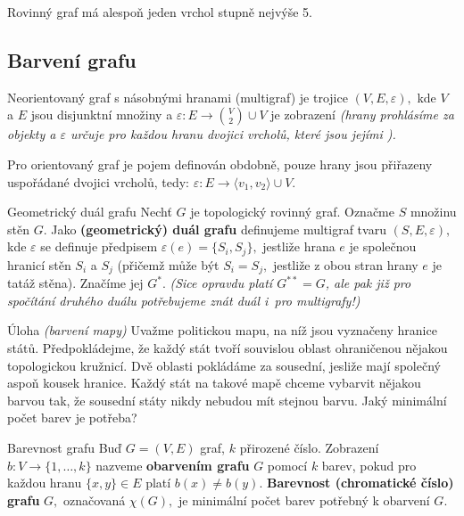 \begin{dusledek}
Rovinný graf má alespoň jeden vrchol stupně nejvýše 5.
\end{dusledek}

\subsection{Barvení grafu}

\begin{definiceN}{Neorientovaný graf s násobnými hranami (multigraf)}
je trojice $(V,E,\varepsilon),$ kde $V$ a $E$ jsou disjunktní množiny a $\varepsilon: E \to \binom{V}{2} \cup V$ je zobrazení \textit{(hrany prohlásíme za  objekty a $\varepsilon$ určuje pro každou hranu dvojici vrcholů, které jsou jejími ).}
\end{definiceN}

\begin{poznamka}
Pro orientovaný graf je pojem definován obdobně, pouze hrany jsou přiřazeny uspořádané dvojici vrcholů, tedy: $\varepsilon: E \to \langle v_1,v_2 \rangle \cup V$.
\end{poznamka}

\begin{definiceN}{Geometrický duál grafu}
Nechť $G$ je topologický rovinný graf. Označme $S$ množinu stěn $G.$ Jako \textbf{(geometrický) duál grafu} definujeme multigraf tvaru $(S,E,\varepsilon),$ kde $\varepsilon$ se definuje předpisem $\varepsilon(e)=\{S_i,S_j\},$ jestliže hrana $e$ je společnou hranicí stěn $S_i$ a $S_j$ (přičemž může být $S_i=S_j,$ jestliže z obou stran hrany $e$ je tatáž stěna). Značíme jej $G^*.$ \textit{(Sice opravdu platí $G^{**}=G$, ale pak již pro spočítání druhého duálu potřebujeme znát duál i~pro multigrafy!)}
\end{definiceN}

\begin{obecne}{Úloha \textit{(barvení mapy)}}
Uvažme politickou mapu, na níž jsou vyznačeny hranice států. Předpokládejme, že každý stát tvoří souvislou oblast ohraničenou nějakou topologickou kružnicí. Dvě oblasti pokládáme za sousední, jesliže mají společný aspoň kousek hranice. Každý stát na takové mapě chceme vybarvit nějakou barvou tak, že sousední státy nikdy nebudou mít stejnou barvu. Jaký minimální počet barev je potřeba?
\end{obecne}

\begin{definiceN}{Barevnost grafu}
Buď $G=(V,E)$ graf, $k$ přirozené číslo. Zobrazení $b: V \rightarrow \{1,\dots,k\}$ nazveme \textbf{obarvením grafu} $G$ pomocí $k$ barev, pokud pro každou hranu $\{x,y\}\in E$ platí $b(x) \not = b(y).$ \textbf{Barevnost (chromatické číslo) grafu} $G,$ označovaná $\chi(G),$ je minimální počet barev potřebný k obarvení $G.$
\end{definiceN}

